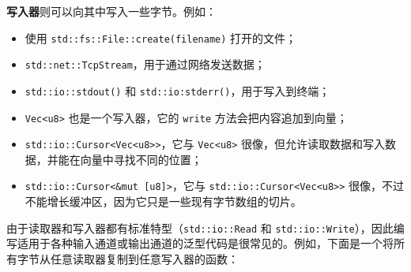 \textbf{写入器}则可以向其中写入一些字节。例如：

\begin{itemize}
\item 使用 \texttt{std::fs::File::create(filename)} 打开的文件；
\item \texttt{std::net::TcpStream}，用于通过网络发送数据；
\item \texttt{std::io::stdout()} 和 \texttt{std::io:stderr()}，用于写入到终端；
\item \texttt{Vec<u8>} 也是一个写入器，它的 \texttt{write} 方法会把内容追加到向量；
\item \texttt{std::io::Cursor<Vec<u8>>}，它与 \texttt{Vec<u8>} 很像，但允许读取数据和写入数据，并能在向量中寻找不同的位置；
\item \texttt{std::io::Cursor<\&mut [u8]>}，它与 \texttt{std::io::Cursor<Vec<u8>>} 很像，不过不能增长缓冲区，因为它只是一些现有字节数组的切片。
\end{itemize}

由于读取器和写入器都有标准特型（\texttt{std::io::Read} 和 \texttt{std::io::Write}），因此编写适用于各种输入通道或输出通道的泛型代码是很常见的。例如，下面是一个将所有字节从任意读取器复制到任意写入器的函数：

